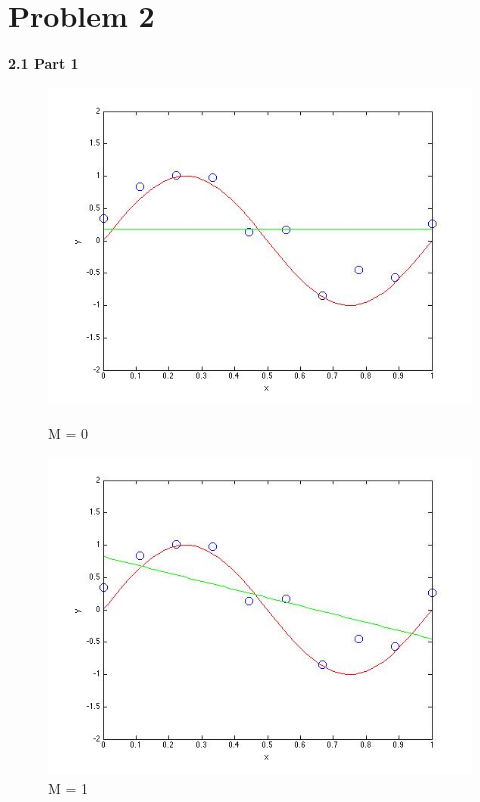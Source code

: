 \section{Problem 2}

{\bfseries 2.1 Part 1}

\begin{figure}[!htb]
  \includegraphics[width=\linewidth]{figures/p2_MLE_M=0}
  \caption{M = 0}\label{fig:figures/p2_MLE_M=0}
\endminipage\hfill
{}
  \includegraphics[width=\linewidth]{figures/p2_MLE_M=1}
  \caption{M = 1}\label{fig:figures/p2_M=1}
\endminipage\hfill
{}                                                                            

\end{figure}
